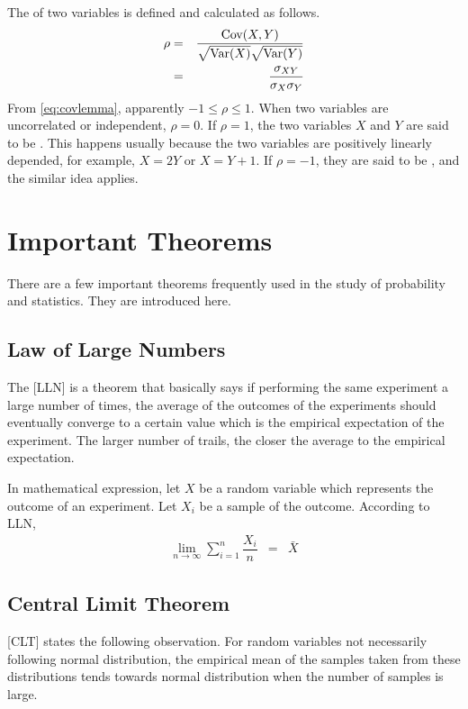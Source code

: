 The  of two variables is defined and calculated as follows.
\begin{eqnarray}
	\rho &=& \dfrac{\textup{Cov}(X, Y)}{\sqrt{\textup{Var}(X)}\sqrt{\textup{Var}(Y)}} \nonumber \\
	&=& \dfrac{\sigma_{XY}}{\sigma_X\sigma_Y} \nonumber
\end{eqnarray}
From \eqref{eq:covlemma}, apparently $-1\leq \rho \leq 1$. When two variables are uncorrelated or independent, $\rho=0$. If $\rho=1$, the two variables $X$ and $Y$ are said to be . This happens usually because the two variables are positively linearly depended, for example, $X=2Y$ or $X=Y+1$. If $\rho=-1$, they are said to be , and the similar idea applies.

\section{Important Theorems}

There are a few important theorems frequently used in the study of probability and statistics. They are introduced here.

\subsection{Law of Large Numbers} \label{subsec:largenumbers}

The [LLN] is a theorem that basically says if performing the same experiment a large number of times, the average of the outcomes of the experiments should eventually converge to a certain value which is the empirical expectation of the experiment. The larger number of trails, the closer the average to the empirical expectation.

In mathematical expression, let $X$ be a random variable which represents the outcome of an experiment. Let $X_i$ be a sample of the outcome. According to LLN,
\begin{eqnarray}
	\lim_{n\rightarrow\infty} \sum_{i=1}^{n}\dfrac{X_i}{n} &=& \bar{X} \nonumber
\end{eqnarray}

\subsection{Central Limit Theorem}

[CLT] states the following observation. For  random variables not necessarily following normal distribution, the empirical mean of the samples taken from these distributions tends towards normal distribution when the number of samples is large.


